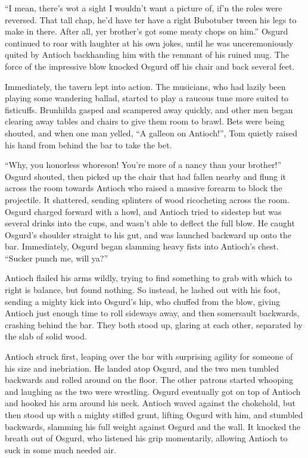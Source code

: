 “I mean, there’s wot a sight I wouldn’t want a picture of, if’n the roles were reversed. That tall chap, he’d have ter have a right Bubotuber tween his legs to make in there. After all, yer brother’s got some meaty chops on him.” Osgurd continued to roar with laughter at his own jokes, until he was unceremoniously quited by Antioch backhanding him with the remnant of his ruined mug. The force of the impressive blow knocked Osgurd off his chair and back several feet.

Immediately, the tavern lept into action. The musicians, who had lazily been playing some wandering ballad, started to play a raucous tune more suited to fisticuffs. Brunhilda gasped and scampered away quickly, and other men began clearing away tables and chairs to give them room to brawl. Bets were being shouted, and when one man yelled, “A galleon on Antioch!”, Tom quietly raised his hand from behind the bar to take the bet.

“Why, you honorless whoreson! You’re more of a nancy than your brother!” Osgurd shouted, then picked up the chair that had fallen nearby and flung it across the room towards Antioch who raised a massive forearm to block the projectile. It shattered, sending splinters of wood ricocheting across the room. Osgurd charged forward with a howl, and Antioch tried to sidestep but was several drinks into the cups, and wasn’t able to deflect the full blow. He caught Osgurd’s shoulder straight to his gut, and was launched backward up onto the bar. Immediately, Osgurd began slamming heavy fists into Antioch’s chest. “Sucker punch me, will ya?”

Antioch flailed his arms wildly, trying to find something to grab with which to right is balance, but found nothing. So instead, he lashed out with his foot, sending a mighty kick into Osgurd’s hip, who chuffed from the blow, giving Antioch just enough time to roll sideways away, and then somersault backwards, crashing behind the bar. They both stood up, glaring at each other, separated by the slab of solid wood.

Antioch struck first, leaping over the bar with surprising agility for someone of his size and inebriation. He landed atop Osgurd, and the two men tumbled backwards and rolled around on the floor. The other patrons started whooping and laughing as the two were wrestling. Osgurd eventually got on top of Antioch and hooked his arm around his neck. Antioch waved against the chokehold, but then stood up with a mighty stifled grunt, lifting Osgurd with him, and stumbled backwards, slamming his full weight against Osgurd and the wall. It knocked the breath out of Osgurd, who listened his grip momentarily, allowing Antioch to suck in some much needed air.

